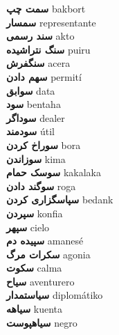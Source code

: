 \textbf{ سمت چپ  } bakbort \\
\textbf{ سمسار  } representante \\
\textbf{ سند رسمی  } akto \\
\textbf{ سنگ نتراشیده  } puiru \\
\textbf{ سنگفرش  } acera \\
\textbf{ سهم دادن  } permití \\
\textbf{ سوابق  } data \\
\textbf{ سود  } bentaha \\
\textbf{ سوداگر  } dealer \\
\textbf{ سودمند  } útil \\
\textbf{ سوراخ کردن  } bora \\
\textbf{ سوزاندن  } kima \\
\textbf{ سوسک حمام  } kakalaka \\
\textbf{ سوگند دادن  } roga \\
\textbf{ سپاسگزاری کردن  } bedank \\
\textbf{ سپردن  } konfia \\
\textbf{ سپهر  } cielo \\
\textbf{ سپیده دم  } amanesé \\
\textbf{ سکرات مرگ  } agonia \\
\textbf{ سکوت  } calma \\
\textbf{ سیاح  } aventurero \\
\textbf{ سیاستمدار  } diplomátiko \\
\textbf{ سیاهه  } kuenta \\
\textbf{ سیاهپوست  } negro \\
